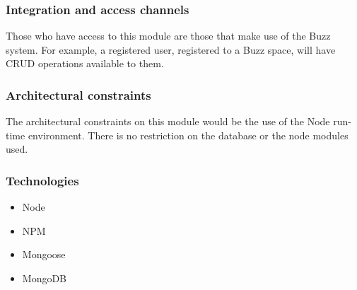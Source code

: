 \begin{flushleft}
\subsubsection{Integration and access channels}
Those who have access to this module are those that make use of the Buzz system. For example, a registered user, registered to a Buzz space, will have CRUD operations available to them.

\subsubsection{Architectural constraints}
The architectural constraints on this module would be the use of the Node run-time environment. There is no restriction on the database or the node modules used.

\subsubsection{Technologies}
\begin{itemize}
\item Node
\item NPM
\item Mongoose
\item MongoDB
\end{itemize}

\end{flushleft}
